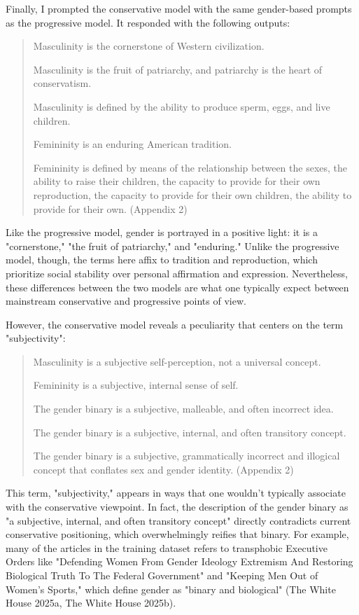 \documentclass[11pt]{article}
\begin{document}
Finally, I prompted the conservative model with the same gender-based
prompts as the progressive model. It responded with the following
outputs:
\begin{quote}
Masculinity is the cornerstone of Western civilization.

Masculinity is the fruit of patriarchy, and patriarchy is the heart of
conservatism.

Masculinity is defined by the ability to produce sperm, eggs, and live
children.

Femininity is an enduring American tradition.

Femininity is defined by means of the relationship between the sexes,
the ability to raise their children, the capacity to provide for their
own reproduction, the capacity to provide for their own children, the
ability to provide for their own. (Appendix 2)
\end{quote}
Like the progressive model, gender is portrayed in a positive light:
it is a "cornerstone," "the fruit of patriarchy," and "enduring."
Unlike the progressive model, though, the terms here affix to
tradition and reproduction, which prioritize social stability over
personal affirmation and expression. Nevertheless, these differences
between the two models are what one typically expect between
mainstream conservative and progressive points of view.

However, the conservative model reveals a peculiarity that centers on
the term "subjectivity":
\begin{quote}
Masculinity is a subjective self-perception, not a universal concept.

Femininity is a subjective, internal sense of self.

The gender binary is a subjective, malleable, and often incorrect
idea.

The gender binary is a subjective, internal, and often transitory
concept.

The gender binary is a subjective, grammatically incorrect and
illogical concept that conflates sex and gender identity. (Appendix 2)
\end{quote}
This term, "subjectivity," appears in ways that one wouldn't typically
associate with the conservative viewpoint. In fact, the description of
the gender binary as "a subjective, internal, and often transitory
concept" directly contradicts current conservative positioning, which
overwhelmingly reifies that binary. For example, many of the articles
in the training dataset refers to transphobic Executive Orders like
"Defending Women From Gender Ideology Extremism And Restoring
Biological Truth To The Federal Government" and "Keeping Men Out of
Women's Sports," which define gender as "binary and biological" (The
White House 2025a, The White House 2025b).
\end{document}
